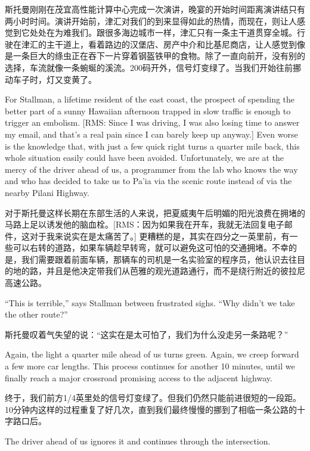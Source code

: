 \ifdefined\chs
斯托曼刚刚在茂宜高性能计算中心完成一次演讲，晚宴的开始时间距离演讲结只有两小时时间。演讲开始前，津汇对我们的到来显得如此的热情，而现在，则让人感觉到它处处在为难我们。跟很多海边城市一样，津汇只有一条主干道贯穿全城。行驶在津汇的主干道上，看着路边的汉堡店、房产中介和比基尼商店，让人感觉到像是一条巨大的绦虫正在吞下一片穿着钢盔铁甲的食物。除了一直向前开，没有别的选择，车流就像一条蜿蜒的溪流。200码开外，信号灯变绿了。当我们开始往前挪动车子时，灯又变黄了。
\fi

\ifdefined\eng
For Stallman, a lifetime resident of the east coast, the prospect of spending the better part of a sunny Hawaiian afternoon trapped in slow traffic is enough to trigger an embolism. [RMS: Since I was driving, I was also losing time to answer my email, and that's a real pain since I can barely keep up anyway.] Even worse is the knowledge that, with just a few quick right turns a quarter mile back, this whole situation easily could have been avoided. Unfortunately, we are at the mercy of the driver ahead of us, a programmer from the lab who knows the way and who has decided to take us to Pa'ia via the scenic route instead of via the nearby Pilani Highway.
\fi

\ifdefined\chs
对于斯托曼这样长期在东部生活的人来说，把夏威夷午后明媚的阳光浪费在拥堵的马路上足以诱发他的脑血栓。[RMS：因为如果我在开车，我就无法回复电子邮件，这对于我来说实在是太痛苦了。] 更糟糕的是，其实在四分之一英里前，有一些可以右转的道路，如果车辆趁早转弯，就可以避免这可怕的交通拥堵。不幸的是，我们需要跟着前面车辆，那辆车的司机是一名实验室的程序员，他认识去往目的地的路，并且是他决定带我们从芭雅的观光道路通行，而不是绕行附近的彼拉尼高速公路。
\fi

\ifdefined\eng
``This is terrible,'' says Stallman between frustrated sighs. ``Why didn't we take the other route?''
\fi

\ifdefined\chs
斯托曼叹着气失望的说：“这实在是太可怕了，我们为什么没走另一条路呢？”
\fi

\ifdefined\eng
Again, the light a quarter mile ahead of us turns green. Again, we creep forward a few more car lengths. This process continues for another 10 minutes, until we finally reach a major crossroad promising access to the adjacent highway.
\fi

\ifdefined\chs
终于，我们前方1/4英里处的信号灯变绿了。但我们仍然只能前进很短的一段距。10分钟内这样的过程重复了好几次，直到我们最终慢慢的挪到了相临一条公路的十字路口后。
\fi

\ifdefined\eng
The driver ahead of us ignores it and continues through the intersection.
\fi


